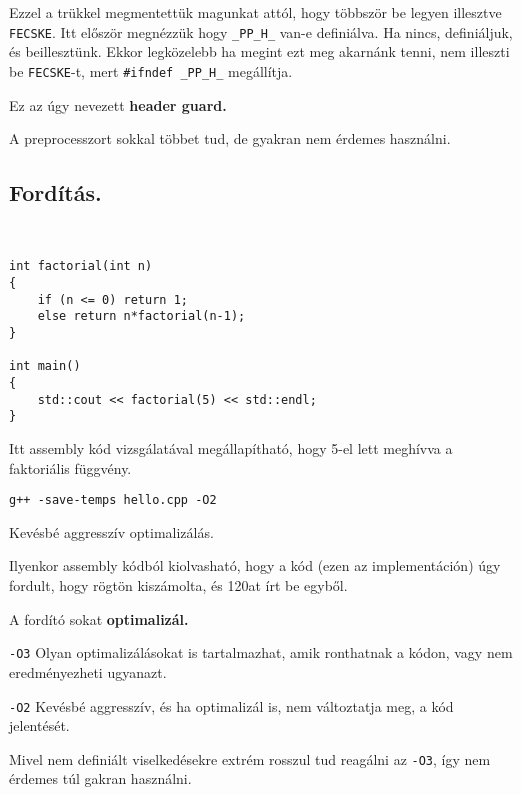\documentclass[a4paper,11.5pt]{article}
\begin{document}
	Ezzel a trükkel megmentettük magunkat attól, hogy többször be legyen illesztve \texttt{FECSKE}. Itt először megnézzük hogy \texttt{\_PP\_H\_} van-e definiálva. Ha nincs, definiáljuk, és beillesztünk. Ekkor legközelebb ha megint ezt meg akarnánk tenni, nem illeszti be \texttt{FECSKE}-t, mert \texttt{\#ifndef \_PP\_H\_} megállítja.
	
	Ez az úgy nevezett \textbf{header guard.}
	
	\medskip
	A preprocesszort sokkal többet tud, de gyakran nem érdemes használni.
	\subsection{Fordítás.}
	\begin{example}\
		
		\begin{lstlisting}
int factorial(int n)
{
	if (n <= 0) return 1;
	else return n*factorial(n-1);
}

int main()
{
	std::cout << factorial(5) << std::endl;
}
		\end{lstlisting}
		
		Itt assembly kód vizsgálatával megállapítható, hogy 5-el lett meghívva a faktoriális függvény.
		\begin{note}
			\texttt{g++ -save-temps hello.cpp -O2}
			
			Kevésbé aggresszív optimalizálás.
		\end{note}
		
		Ilyenkor assembly kódból kiolvasható, hogy a kód (ezen az implementáción) úgy fordult, hogy rögtön kiszámolta, és 120at írt be egyből.
		
		A fordító sokat \textbf{optimalizál.}
	\end{example} 
	\begin{note}
		\texttt{-O3} Olyan optimalizálásokat is tartalmazhat, amik ronthatnak a kódon, vagy nem eredményezheti ugyanazt.
		
		\texttt{-O2} Kevésbé aggresszív, és ha optimalizál is, nem változtatja meg, a kód jelentését.
		
		Mivel nem definiált viselkedésekre extrém rosszul tud reagálni az \texttt{-O3}, így nem érdemes túl gakran használni.
	\end{note}
	
\end{document}
